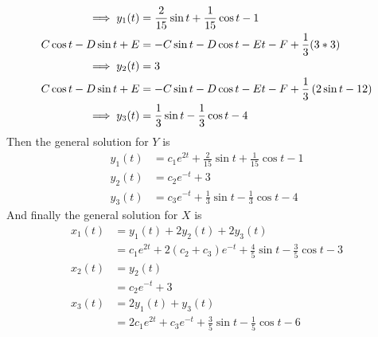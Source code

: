 \documentclass{article}
\begin{document}
\begin{myleftlinebox}
\begin{equation*}
\begin{split}
            \implies y_1(t) &= \frac{2}{15}\sin t+\frac{1}{15}\cos t-1\\
            C \cos t-D\sin t+E &= -C\sin t-D\cos t-Et-F+\frac{1}{3}(3*3)\\
            \implies y_2(t) &= 3\\
            C \cos t-D\sin t+E &=-C\sin t-D\cos t-Et-F+\frac{1}{3}\left( 2\sin t-12 \right)\\
            \implies y_3(t) &= \frac{1}{3}\sin t-\frac{1}{3}\cos t-4
        \end{split}
    \end{equation*}
    Then the general solution for \(Y\) is
    \begin{align*}
        y_1(t) &= c_1 e^{2t}+\frac{2}{15}\sin t+\frac{1}{15}\cos t-1\\
        y_2(t) &= c_2 e^{-t}+3\\
        y_3(t) &= c_3 e^{-t}+\frac{1}{3}\sin t-\frac{1}{3}\cos t-4
    \end{align*}
    And finally the general solution for \(X\) is 
    \begin{align*}
        x_1(t) &= y_1(t)+2y_2(t)+2y_3(t)\\
        &= c_1 e^{2t}+2(c_2+c_3)e^{-t}+\frac{4}{5}\sin t-\frac{3}{5}\cos t-3\\
        x_2(t) &= y_2(t)\\
        &= c_2 e^{-t}+3\\
        x_3(t) &= 2y_1(t)+y_3(t)\\
        &= 2c_1 e^{2t}+c_3 e^{-t}+\frac{3}{5}\sin t-\frac{1}{5}\cos t-6
    \end{align*}
\end{myleftlinebox}
\end{document}

